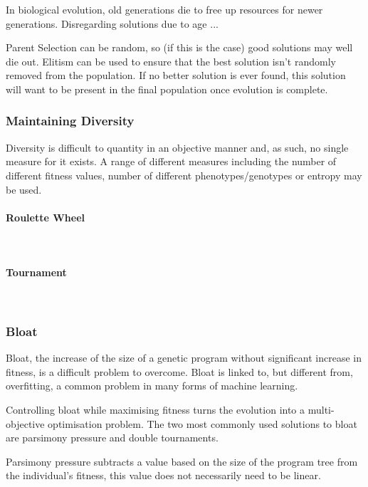 \documentclass{article}
\newcommand{\myparagraph}[1]{\paragraph{#1}\mbox{}\\}
\begin{document}
In biological evolution, old generations die to free up resources for newer generations.
Disregarding solutions due to age ... %

Parent Selection can be random, so (if this is the case) good solutions may well die out. Elitism can be used to ensure that the best solution isn't randomly removed from the population. If no better solution is ever found, this solution will want to be present in the final population once evolution is complete.


\subsubsection{Maintaining Diversity}
Diversity is difficult to quantity in an objective manner and, as such, no single measure for it exists. A range of different measures including the number of different fitness values, number of different phenotypes/genotypes or entropy may be used\cite{textbook}.

\myparagraph{Roulette Wheel}

\myparagraph{Tournament}
\label{tournament}


\subsubsection{Bloat}%
Bloat, the increase of the size of a genetic program without significant increase in fitness, is a difficult problem to overcome. Bloat is linked to, but different from, overfitting, a common problem in many forms of machine learning\cite{overfitting_bloat}. %

Controlling bloat while maximising fitness turns the evolution into a multi-objective optimisation problem. The two most commonly used solutions to bloat are parsimony pressure and double tournaments.

Parsimony pressure subtracts a value based on the size of the program tree from the individual's fitness, this value does not necessarily need to be linear. %
\end{document}
